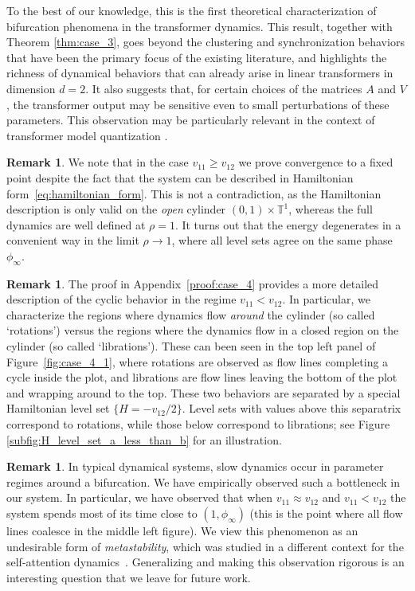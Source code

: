 \documentclass[10pt]{article}
\theoremstyle{definition}
\theoremstyle{definition}
\newtheorem{remark}[theorem]{Remark}
\numberwithin{equation}{section}
\newcommand{\BBT}{\mathbb{T}}
\begin{document}
To the best of our knowledge, this is the first theoretical characterization of bifurcation phenomena in the transformer dynamics.
This result, together with Theorem \ref{thm:case_3}, goes beyond the clustering and synchronization behaviors that have been the primary focus of the existing literature, and highlights the richness of dynamical behaviors that can already arise in linear transformers in dimension $d=2$.
It also suggests that, for certain choices of the matrices $A$ and $V$, the transformer output may be sensitive even to small perturbations of these parameters.
This observation may be particularly relevant in the context of transformer model quantization \cite{xiao2023smoothquant,hooper2024kvquant}.

\begin{remark}
We note that in the case $v_{11} \geq v_{12}$ we prove convergence to a fixed point despite the fact that the system can be described in Hamiltonian form~\eqref{eq:hamiltonian_form}.  This is not a contradiction, as the Hamiltonian description is only valid on the \textit{open} cylinder $(0,1) \times \BBT^1$, whereas the full dynamics are well defined at $\rho = 1$.  It turns out that the energy degenerates in a convenient way in the limit $\rho \to 1$, where all level sets agree on the same phase $\phi_\infty$.
\end{remark}

\begin{remark}
The proof in Appendix~\ref{proof:case_4} provides a more detailed description of the cyclic behavior in the regime $v_{11} < v_{12}$.
In particular, we characterize the regions where dynamics flow \textit{around} the cylinder (so called `rotations') versus the regions where the dynamics flow in a closed region on the cylinder (so called `librations').  
These can been seen in the top left panel of Figure~\ref{fig:case_4_1}, where rotations are observed as flow lines completing a cycle inside the plot, and librations are flow lines leaving the bottom of the plot and wrapping around to the top. These two behaviors are separated by a special Hamiltonian level set $\{H = -v_{12}/2 \}$.
Level sets with values above this separatrix correspond to rotations, while those below correspond to librations; see Figure \ref{subfig:H_level_set_a_less_than_b} for an illustration.
\end{remark}

\begin{remark}
In typical dynamical systems, slow dynamics occur in parameter regimes around a bifurcation. We have empirically observed such a bottleneck in our system. In particular, we have observed that when $v_{11} \approx v_{12}$ and $v_{11} < v_{12}$ the system spends most of its time close to $(1, \phi_\infty)$ (this is the point where all flow lines coalesce in the middle left figure).
We view this phenomenon as an undesirable form of \textit{metastability}, which was studied in a different context for the self-attention dynamics~\cite{geshkovski2023mathematical}. Generalizing and making this observation rigorous is an interesting question that we leave for future work.
\end{remark}
\end{document}
